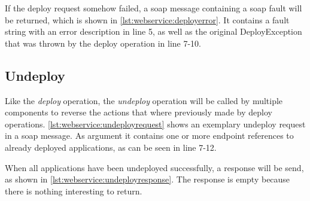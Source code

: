If the deploy request somehow failed, a soap message containing a soap fault will be returned, which is shown in \autoref{lst:webservice:deployerror}.
It contains a fault string with an error description in line 5, as well as the original DeployException that was thrown by the deploy operation in line 7-10.

\vspace*{\baselineskip}

\subsection{Undeploy}

Like the \textit{deploy} operation, the \textit{undeploy} operation will be called by multiple components to reverse the actions that where previously made by deploy operations.
\autoref{lst:webservice:undeployrequest} shows an exemplary undeploy request in a soap message.
As argument it contains one or more endpoint references to already deployed applications, as can be seen in line 7-12.

\vspace*{\baselineskip}

When all applications have been undeployed successfully, a response will be send, as shown in \autoref{lst:webservice:undeployresponse}.
The response is empty because there is nothing interesting to return.

\vspace*{\baselineskip}

